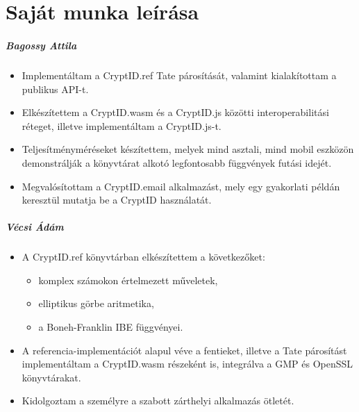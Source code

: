 \chapter*{Saját munka leírása}

\if{}
    \paragraph{Bagossy Attila}
\fi

\begin{itemize}
    \item
    Implementáltam a CryptID.ref Tate párosítását, valamint kialakítottam a publikus API-t.

    \item
    Elkészítettem a CryptID.wasm és a CryptID.js közötti interoperabilitási réteget, illetve implementáltam a CryptID.js-t.

    \item
    Teljesítményméréseket készítettem, melyek mind asztali, mind mobil eszközön demonstrálják a könyvtárat alkotó legfontosabb függvények futási idejét.

    \item
    Megvalósítottam a CryptID.email alkalmazást, mely egy gyakorlati példán keresztül mutatja be a CryptID használatát.

\end{itemize}

\if{}
    \paragraph{Vécsi Ádám}
\else
    \hfill\break
    \hfill\break
    \hfill\break
\fi

\begin{itemize}
    \item
    A CryptID.ref könyvtárban elkészítettem a következőket:

    \begin{itemize}
        \item
        komplex számokon értelmezett műveletek,

        \item
        elliptikus görbe aritmetika,

        \item
        a Boneh-Franklin IBE függvényei.
    \end{itemize}

    \item
    A referencia-implementációt alapul véve a fentieket, illetve a Tate párosítást implementáltam a CryptID.wasm részeként is, integrálva a GMP és OpenSSL könyvtárakat.

    \item
    Kidolgoztam a személyre a szabott zárthelyi alkalmazás ötletét.

\end{itemize}
